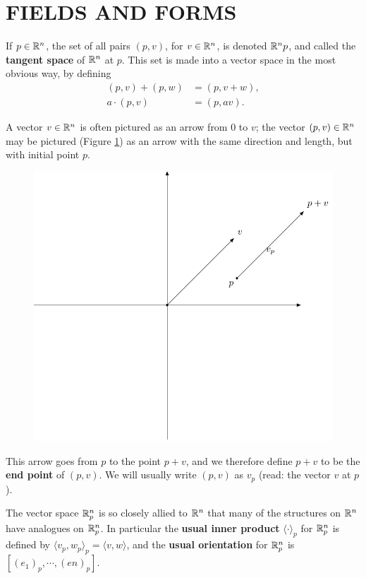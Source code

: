 \clearpage
\section[\textsc{fields and forms}]{FIELDS AND FORMS}
If $p\in\mathbb{R}^n$, the set of all pairs $(p,v)$, for $v\in \mathbb{R}^n$, is denoted $\mathbb{R}^n p$, and 
called the \textbf{tangent space} of $\mathbb{R}^n$ at $p$. This set is made into a vector space in 
the most obvious way, by defining
\begin{align*}
    (p,v) + (p,w) & = (p, v+w), \\
    a\cdot (p, v) & = (p, av).
\end{align*}

A vector $v\in\mathbb{R}^n$ is often pictured as an arrow from 0 to $v$; the
vector $(p,v)\in\mathbb{R}^n$ may be pictured (Figure \ref{Fig 4-1}) as an arrow
with the same direction and length, but with initial point $p$.

\begin{figure}[H]
    \centering
    \includegraphics[width=.75\linewidth]{./pics/Fig4-1.pdf}
    \caption{}
    \label{Fig 4-1}
\end{figure}

This arrow goes from $p$ to the point $p + v$, and we therefore
define $p + v$ to be the \textbf{end point} of $(p,v)$.
We will usually write $(p,v)$ as $v_p$ (read: the vector $v$ at $p$).

The vector space $\mathbb{R}^n_p$ is so closely allied to $\mathbb{R}^n$ that many
of the structures on $\mathbb{R}^n$ have analogues on $\mathbb{R}^n_p$. 
In particular the \textbf{usual inner product} $\langle \cdot\rangle_p$ for $\mathbb{R}^n_p$ 
is defined by $\langle v_p, w_p\rangle_p = \langle v,w\rangle$, 
and the \textbf{usual orientation} for $\mathbb{R}^n_p$ is $[(e_1)_p, \cdots, (en)_p]$. 

